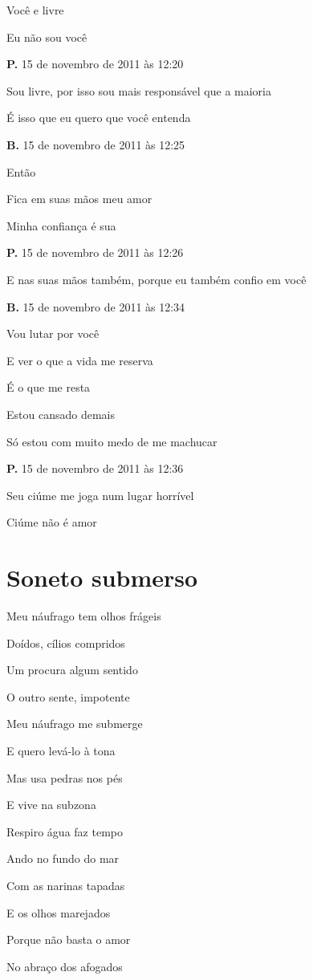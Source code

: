 {Você e livre

Eu não sou você

\textbf{P.} 15 de novembro de 2011 às 12:20

Sou livre, por isso sou mais responsável que a maioria

É isso que eu quero que você entenda

\textbf{B.} 15 de novembro de 2011 às 12:25

Então

Fica em suas mãos meu amor

Minha confiança é sua

\textbf{P.} 15 de novembro de 2011 às 12:26

E nas suas mãos também, porque eu também confio em você

\textbf{B.} 15 de novembro de 2011 às 12:34

Vou lutar por você

E ver o que a vida me reserva

É o que me resta

Estou cansado demais

Só estou com muito medo de me machucar

\textbf{P.} 15 de novembro de 2011 às 12:36

Seu ciúme me joga num lugar horrível

Ciúme não é amor
}

\chapter{Soneto submerso}

{\parindent0pt
Meu náufrago tem olhos frágeis

Doídos, cílios compridos

Um procura algum sentido

O outro sente, impotente

Meu náufrago me submerge

E quero levá-lo à tona

Mas usa pedras nos pés

E vive na subzona

Respiro água faz tempo

Ando no fundo do mar

Com as narinas tapadas

E os olhos marejados

Porque não basta o amor

No abraço dos afogados
}

